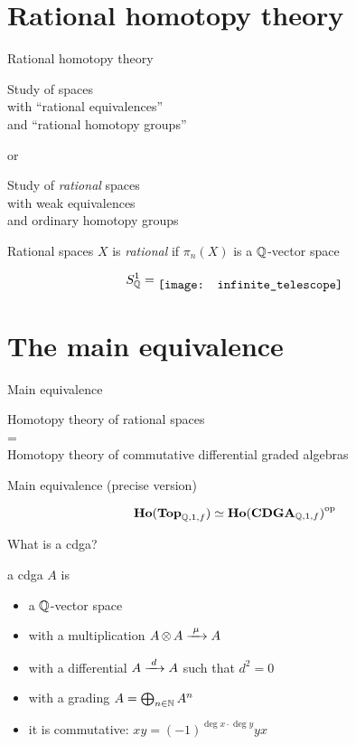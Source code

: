 \documentclass[14pt]{beamer}
\newcommand{\Frame}[2]{
	\begin{frame}{#1}#2\end{frame}
}
\begin{document}
\section{Rational homotopy theory}
\Frame{Rational homotopy theory}{
	\begin{center}
	Study of spaces\\
	with ``rational equivalences'' \\
	and ``rational homotopy groups''

	\pause
	\bigskip
	or
	\bigskip

	Study of \emph{rational} spaces \\
	with weak equivalences \\
	and ordinary homotopy groups
	\end{center}
}

\Frame{Rational spaces}{
	$X$ is \emph{rational} if $\pi_n(X)$ is a $\mathbb{Q}$-vector space

	\bigskip
	\[ S^1_\Q = \raisebox{-0.55\height}{\texttt{[image: infinite\_telescope]}} \]
}


\section{The main equivalence}
\Frame{Main equivalence}{
	\begin{theorem}
	\begin{center}
		Homotopy theory of rational spaces \\
		= \\
		Homotopy theory of commutative differential graded algebras
	\end{center}
	\end{theorem}
}

\Frame{Main equivalence (precise version)}{
	\begin{theorem}
		\[ \mathbf{Ho}(\mathbf{Top}_{\mathbb{Q}, 1, f}) \simeq {\mathbf{Ho}(\mathbf{CDGA}_{\mathbb{Q}, 1, f})}^{\text{op}} \]
	\end{theorem}
}

\Frame{What is a cdga?}{
	\begin{definition}
		a cdga $A$ is
		\begin{itemize}
			\item a $\mathbb{Q}$-vector space
			\item with a multiplication $A \operatorname*{\otimes} A \xrightarrow{\,\,{\mu}\,\,} A$
			\item with a differential $A \xrightarrow{\,\,{d}\,\,} A$ such that $d^2 = 0$
			\item with a grading $A = \bigoplus_{n \in \mathbb{N}} A^n$
			\item it is commutative: $ x y = (-1)^{\deg{x}\cdot\deg{y}} y x $
		\end{itemize}
	\end{definition}
}
\end{document}
